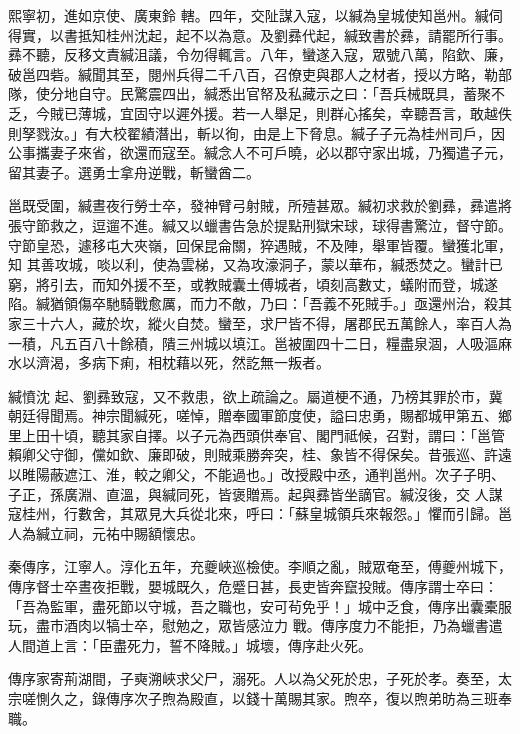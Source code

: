 \begin{pinyinscope}
 熙寧初，進如京使、廣東鈴
 轄。四年，交阯謀入寇，以緘為皇城使知邕州。緘伺得實，以書抵知桂州沈起，起不以為意。及劉彞代起，緘致書於彞，請罷所行事。彞不聽，反移文責緘沮議，令勿得輒言。八年，蠻遂入寇，眾號八萬，陷欽、廉，破邕四砦。緘聞其至，閱州兵得二千八百，召僚吏與郡人之材者，授以方略，勒部隊，使分地自守。民驚震四出，緘悉出官帑及私藏示之曰：「吾兵械既具，蓄聚不乏，今賊已薄城，宜固守以遲外援。若一人舉足，則群心搖矣，幸聽吾言，敢越佚
 則孥戮汝。」有大校翟績潛出，斬以徇，由是上下脅息。緘子子元為桂州司戶，因公事攜妻子來省，欲還而寇至。緘念人不可戶曉，必以郡守家出城，乃獨遣子元，留其妻子。選勇士拿舟逆戰，斬蠻酋二。



 邕既受圍，緘晝夜行勞士卒，發神臂弓射賊，所殪甚眾。緘初求救於劉彞，彞遣將張守節救之，逗遛不進。緘又以蠟書告急於提點刑獄宋球，球得書驚泣，督守節。守節皇恐，遽移屯大夾嶺，回保昆侖關，猝遇賊，不及陣，舉軍皆覆。蠻獲北軍，知
 其善攻城，啖以利，使為雲梯，又為攻濠洞子，蒙以華布，緘悉焚之。蠻計已窮，將引去，而知外援不至，或教賊囊土傅城者，頃刻高數丈，蟻附而登，城遂陷。緘猶領傷卒馳騎戰愈厲，而力不敵，乃曰：「吾義不死賊手。」亟還州治，殺其家三十六人，藏於坎，縱火自焚。蠻至，求尸皆不得，屠郡民五萬餘人，率百人為一積，凡五百八十餘積，隤三州城以填江。邕被圍四十二日，糧盡泉涸，人吸漚麻水以濟渴，多病下痢，相枕藉以死，然訖無一叛者。



 緘憤沈
 起、劉彞致寇，又不救患，欲上疏論之。屬道梗不通，乃榜其罪於市，冀朝廷得聞焉。神宗聞緘死，嗟悼，贈奉國軍節度使，謚曰忠勇，賜都城甲第五、鄉里上田十頃，聽其家自擇。以子元為西頭供奉官、閣門祗候，召對，謂曰：「邕管賴卿父守御，儻如欽、廉即破，則賊乘勝奔突，桂、象皆不得保矣。昔張巡、許遠以睢陽蔽遮江、淮，較之卿父，不能過也。」改授殿中丞，通判邕州。次子子明、子正，孫廣淵、直溫，與緘同死，皆褒贈焉。起與彞皆坐謫官。緘沒後，交
 人謀寇桂州，行數舍，其眾見大兵從北來，呼曰：「蘇皇城領兵來報怨。」懼而引歸。邕人為緘立祠，元祐中賜額懷忠。



 秦傳序，江寧人。淳化五年，充夔峽巡檢使。李順之亂，賊眾奄至，傅夔州城下，傳序督士卒晝夜拒戰，嬰城既久，危蹙日甚，長吏皆奔竄投賊。傳序謂士卒曰：「吾為監軍，盡死節以守城，吾之職也，安可茍免乎！」城中乏食，傳序出囊橐服玩，盡市酒肉以犒士卒，慰勉之，眾皆感泣力
 戰。傳序度力不能拒，乃為蠟書遣人間道上言：「臣盡死力，誓不降賊。」城壞，傳序赴火死。



 傳序家寄荊湖間，子奭溯峽求父尸，溺死。人以為父死於忠，子死於孝。奏至，太宗嗟惻久之，錄傳序次子煦為殿直，以錢十萬賜其家。煦卒，復以煦弟昉為三班奉職。




\end{pinyinscope}
